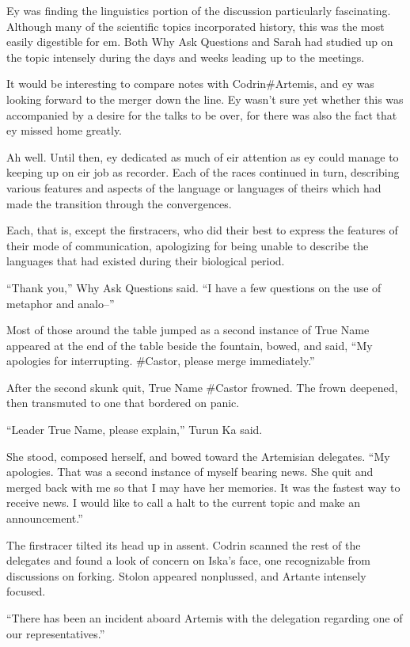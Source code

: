 Ey was finding the linguistics portion of the discussion particularly fascinating. Although many of the scientific topics incorporated history, this was the most easily digestible for em. Both Why Ask Questions and Sarah had studied up on the topic intensely during the days and weeks leading up to the meetings.

It would be interesting to compare notes with Codrin\#Artemis, and ey was looking forward to the merger down the line. Ey wasn't sure yet whether this was accompanied by a desire for the talks to be over, for there was also the fact that ey missed home greatly.

Ah well. Until then, ey dedicated as much of eir attention as ey could manage to keeping up on eir job as recorder. Each of the races continued in turn, describing various features and aspects of the language or languages of theirs which had made the transition through the convergences.

Each, that is, except the firstracers, who did their best to express the features of their mode of communication, apologizing for being unable to describe the languages that had existed during their biological period.

``Thank you,'' Why Ask Questions said. ``I have a few questions on the use of metaphor and analo--''

Most of those around the table jumped as a second instance of True Name appeared at the end of the table beside the fountain, bowed, and said, ``My apologies for interrupting. \#Castor, please merge immediately.''

After the second skunk quit, True Name \#Castor frowned. The frown deepened, then transmuted to one that bordered on panic.

``Leader True Name, please explain,'' Turun Ka said.

She stood, composed herself, and bowed toward the Artemisian delegates. ``My apologies. That was a second instance of myself bearing news. She quit and merged back with me so that I may have her memories. It was the fastest way to receive news. I would like to call a halt to the current topic and make an announcement.''

The firstracer tilted its head up in assent. Codrin scanned the rest of the delegates and found a look of concern on Iska's face, one recognizable from discussions on forking. Stolon appeared nonplussed, and Artante intensely focused.

``There has been an incident aboard Artemis with the delegation regarding one of our representatives.''

